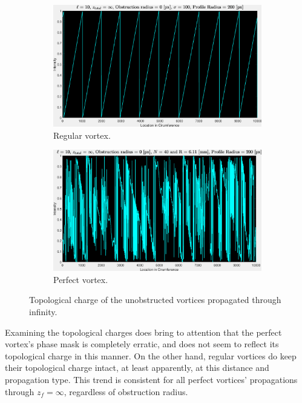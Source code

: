 \begin{figure}[htbp]
    \centering
    \begin{subfigure}[b]{0.45\textwidth}
        \centering
        \includegraphics[width=\textwidth]{images/c04/type=0_r=0_zi=0_zf=Inf_TC.eps}
        \caption{Regular vortex.}
    \end{subfigure}
    \hfill
    \begin{subfigure}[b]{0.45\textwidth}
        \centering
        \includegraphics[width=\textwidth]{images/c04/type=1_r=0_zi=0_zf=Inf_TC.eps}
        \caption{Perfect vortex.}
    \end{subfigure}
    \caption{Topological charge of the unobstructed vortices propagated through infinity.}
    \label{fig:Vortices_r=0_z=inf_TC}
\end{figure}

Examining the topological charges does bring to attention that the perfect vortex's phase mask is completely erratic, and does not seem to reflect its topological charge in this manner. On the other hand, regular vortices do keep their topological charge intact, at least apparently, at this distance and propagation type. This trend is consistent for all perfect vortices' propagations through $z_f = \infty$, regardless of obstruction radius.

